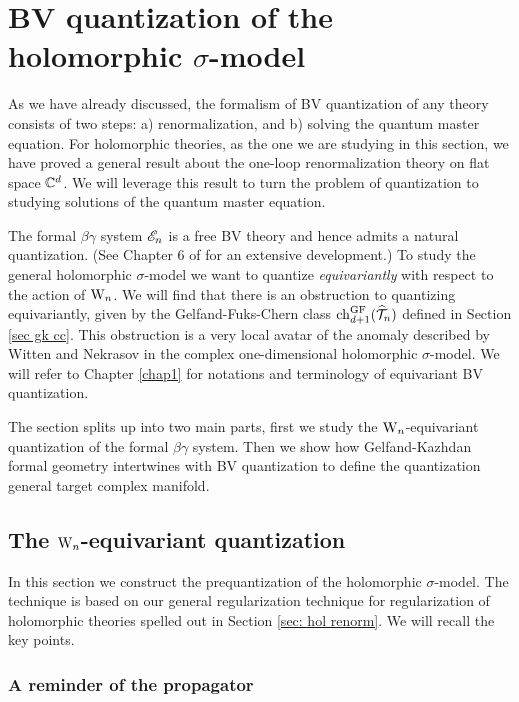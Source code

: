 \documentclass[10pt]{amsart}
\begin{document}
\section{BV quantization of the holomorphic $\sigma$-model}

As we have already discussed, the formalism of BV quantization of any theory consists of two steps: a) renormalization, and b) solving the quantum master equation. 
For holomorphic theories, as the one we are studying in this section, we have proved a general result about the one-loop renormalization theory on flat space $\mathbb C^d$. 
We will leverage this result to turn the problem of quantization to studying solutions of the quantum master equation.

The formal $\beta\gamma$ system $\mathscr E_n$ is a free BV theory and hence admits a natural quantization.
(See Chapter 6 of \cite{GwThesis} for an extensive development.)  
To study the general holomorphic $\sigma$-model we want to quantize \emph{equivariantly} with respect to the action of ${{\rm W}_n}$.
We will find that there is an obstruction to quantizing equivariantly, 
given by the Gelfand-Fuks-Chern class ${\rm ch}_{d+1}^{{\rm GF}}(\widehat{\mathcal T}_n)$ defined in Section \ref{sec gk cc}. 
This obstruction is a very local avatar of the anomaly described by Witten and Nekrasov \cite{WittenCDO,Nek} in the complex one-dimensional holomorphic $\sigma$-model.
We will refer to Chapter \ref{chap1} for notations and terminology of equivariant BV quantization.

The section splits up into two main parts, first we study the ${{\rm W}_n}$-equivariant quantization of the formal $\beta\gamma$ system.
Then we show how Gelfand-Kazhdan formal geometry intertwines with BV quantization to define the quantization general target complex manifold. 

\subsection{The ${{\rm W}_n}$-equivariant quantization}

In this section we construct the prequantization of the holomorphic $\sigma$-model.
The technique is based on our general regularization technique for regularization of holomorphic theories spelled out in Section \ref{sec: hol renorm}. 
We will recall the key points.

\subsubsection{A reminder of the propagator}
\end{document}
